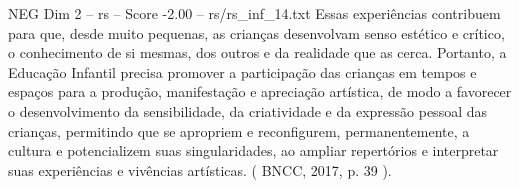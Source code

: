 \begin{textsample}{NEG Dim 2 – rs – Score -2.00 – rs/rs\_inf\_14.txt}
Essas experiências contribuem para que, desde muito pequenas, as crianças desenvolvam senso estético e crítico, o conhecimento de si mesmas, dos outros e da realidade que as cerca.
Portanto, a Educação Infantil precisa promover a participação das crianças em tempos e espaços para a produção, manifestação e apreciação artística, de modo a favorecer o desenvolvimento da sensibilidade, da criatividade e da expressão pessoal das crianças, permitindo que se apropriem e reconfigurem, permanentemente, a cultura e potencializem suas singularidades, ao ampliar repertórios e interpretar suas experiências e vivências artísticas. ( BNCC, 2017, p. 39 ).

\end{textsample}
